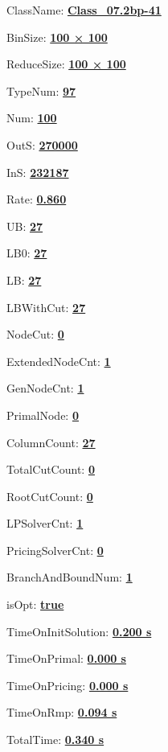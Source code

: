 \documentclass[11pt]{article}
\begin{document}
\pagestyle{empty}


ClassName: \underline{\textbf{Class_07.2bp-41}}
\par
BinSize: \underline{\textbf{100 × 100}}
\par
ReduceSize: \underline{\textbf{100 × 100}}
\par
TypeNum: \underline{\textbf{97}}
\par
Num: \underline{\textbf{100}}
\par
OutS: \underline{\textbf{270000}}
\par
InS: \underline{\textbf{232187}}
\par
Rate: \underline{\textbf{0.860}}
\par
UB: \underline{\textbf{27}}
\par
LB0: \underline{\textbf{27}}
\par
LB: \underline{\textbf{27}}
\par
LBWithCut: \underline{\textbf{27}}
\par
NodeCut: \underline{\textbf{0}}
\par
ExtendedNodeCnt: \underline{\textbf{1}}
\par
GenNodeCnt: \underline{\textbf{1}}
\par
PrimalNode: \underline{\textbf{0}}
\par
ColumnCount: \underline{\textbf{27}}
\par
TotalCutCount: \underline{\textbf{0}}
\par
RootCutCount: \underline{\textbf{0}}
\par
LPSolverCnt: \underline{\textbf{1}}
\par
PricingSolverCnt: \underline{\textbf{0}}
\par
BranchAndBoundNum: \underline{\textbf{1}}
\par
isOpt: \underline{\textbf{true}}
\par
TimeOnInitSolution: \underline{\textbf{0.200 s}}
\par
TimeOnPrimal: \underline{\textbf{0.000 s}}
\par
TimeOnPricing: \underline{\textbf{0.000 s}}
\par
TimeOnRmp: \underline{\textbf{0.094 s}}
\par
TotalTime: \underline{\textbf{0.340 s}}
\par
\newpage


\end{document}
